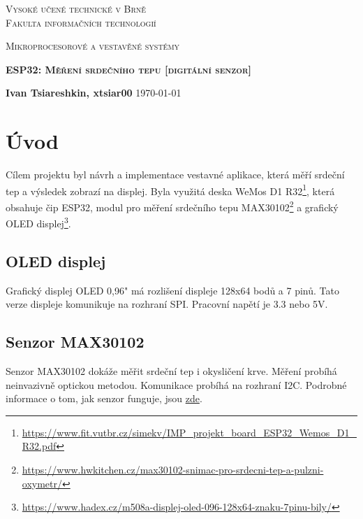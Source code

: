 \documentclass[a4paper, 12pt,h]{article}
\begin{document}
\begin{titlepage}
    \begin{center}
        \textsc{\Huge{Vysoké učené technické v Brně\\[0.3em]}}
        \textsc{\huge{Fakulta informačních technologií}}    
        
        \textsc{\Huge{Mikroprocesorové a vestavěné systémy\\[0.3em]}}
        
        \textbf{\textsc{\LARGE{ESP32: Měření srdečního tepu [digitální senzor]}}}        
    \end{center}
    {   
        \Large \textbf{Ivan Tsiareshkin, xtsiar00} \quad \quad \quad \quad \quad \quad \quad \quad \quad \today 
    }
\end{titlepage}

\tableofcontents

\newpage

\section{Úvod}
Cílem projektu byl návrh a implementace vestavné aplikace, která měří srdeční tep a výsledek zobrazí na displej. Byla využitá deska WeMos D1 R32\footnote{\href{https://www.fit.vutbr.cz/~simekv/IMP\_projekt\_board\_ESP32\_Wemos\_D1\_R32.pdf}{https://www.fit.vutbr.cz/simekv/IMP\_projekt\_board\_ESP32\_Wemos\_D1\_R32.pdf}}, která obsahuje čip ESP32, modul pro měření srdečního tepu MAX30102\footnote{\href{https://www.hwkitchen.cz/max30102-snimac-pro-srdecni-tep-a-pulzni-oxymetr/}{https://www.hwkitchen.cz/max30102-snimac-pro-srdecni-tep-a-pulzni-oxymetr/}} a grafický OLED displej\footnote{\href{https://www.hadex.cz/m508a-displej-oled-096-128x64-znaku-7pinu-bily/}{https://www.hadex.cz/m508a-displej-oled-096-128x64-znaku-7pinu-bily/}}.

\subsection{OLED displej}
Grafický displej OLED 0,96" má rozlišení displeje 128x64 bodů a 7 pinů. Tato verze displeje komunikuje na rozhraní SPI. Pracovní napětí je 3.3 nebo 5V.

\subsection{Senzor MAX30102}
Senzor MAX30102 dokáže měřit srdeční tep i okysličení krve. Měření probíhá neinvazivně optickou metodou. Komunikace probíhá na rozhraní I2C. Podrobné informace o tom, jak senzor funguje, jsou \href{https://www.hwkitchen.cz/max30102-snimac-pro-srdecni-tep-a-pulzni-oxymetr/}{zde}.
\end{document}
